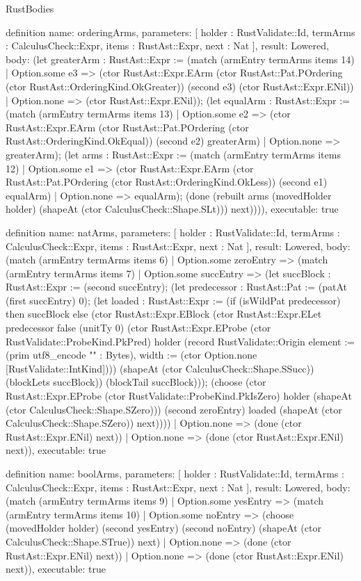 \begin{lexlean}{RustBodies}
\begin{semanticmodule}
definition{
  name: orderingArms,
  parameters: [
    holder : RustValidate::Id,
    termArms : CalculusCheck::Expr,
    items : RustAst::Expr,
    next : Nat
  ],
  result: Lowered,
  body: (let greaterArm : RustAst::Expr := (match (armEntry termArms items 14)
    | Option.some e3 => (ctor RustAst::Expr.EArm (ctor RustAst::Pat.POrdering (ctor RustAst::OrderingKind.OkGreater)) (second e3) (ctor RustAst::Expr.ENil))
    | Option.none => (ctor RustAst::Expr.ENil)); (let equalArm : RustAst::Expr := (match (armEntry termArms items 13)
    | Option.some e2 => (ctor RustAst::Expr.EArm (ctor RustAst::Pat.POrdering (ctor RustAst::OrderingKind.OkEqual)) (second e2) greaterArm)
    | Option.none => greaterArm); (let arms : RustAst::Expr := (match (armEntry termArms items 12)
    | Option.some e1 => (ctor RustAst::Expr.EArm (ctor RustAst::Pat.POrdering (ctor RustAst::OrderingKind.OkLess)) (second e1) equalArm)
    | Option.none => equalArm); (done (rebuilt arms (movedHolder holder) (shapeAt (ctor CalculusCheck::Shape.SLt))) next)))),
  executable: true
}

definition{
  name: natArms,
  parameters: [
    holder : RustValidate::Id,
    termArms : CalculusCheck::Expr,
    items : RustAst::Expr,
    next : Nat
  ],
  result: Lowered,
  body: (match (armEntry termArms items 6)
    | Option.some zeroEntry => (match (armEntry termArms items 7)
      | Option.some succEntry => (let succBlock : RustAst::Expr := (second succEntry); (let predecessor : RustAst::Pat := (patAt (first succEntry) 0); (let loaded : RustAst::Expr := (if (isWildPat predecessor) then succBlock else (ctor RustAst::Expr.EBlock (ctor RustAst::Expr.ELet predecessor false (unitTy 0) (ctor RustAst::Expr.EProbe (ctor RustValidate::ProbeKind.PkPred) holder (record RustValidate::Origin {element := (prim utf8_encode "" : Bytes), width := (ctor Option.none [RustValidate::IntKind])})) (shapeAt (ctor CalculusCheck::Shape.SSucc)) (blockLets succBlock)) (blockTail succBlock))); (choose (ctor RustAst::Expr.EProbe (ctor RustValidate::ProbeKind.PkIsZero) holder (shapeAt (ctor CalculusCheck::Shape.SZero))) (second zeroEntry) loaded (shapeAt (ctor CalculusCheck::Shape.SZero)) next))))
      | Option.none => (done (ctor RustAst::Expr.ENil) next))
    | Option.none => (done (ctor RustAst::Expr.ENil) next)),
  executable: true
}

definition{
  name: boolArms,
  parameters: [
    holder : RustValidate::Id,
    termArms : CalculusCheck::Expr,
    items : RustAst::Expr,
    next : Nat
  ],
  result: Lowered,
  body: (match (armEntry termArms items 9)
    | Option.some yesEntry => (match (armEntry termArms items 10)
      | Option.some noEntry => (choose (movedHolder holder) (second yesEntry) (second noEntry) (shapeAt (ctor CalculusCheck::Shape.STrue)) next)
      | Option.none => (done (ctor RustAst::Expr.ENil) next))
    | Option.none => (done (ctor RustAst::Expr.ENil) next)),
  executable: true
}


\end{semanticmodule}
\end{lexlean}

